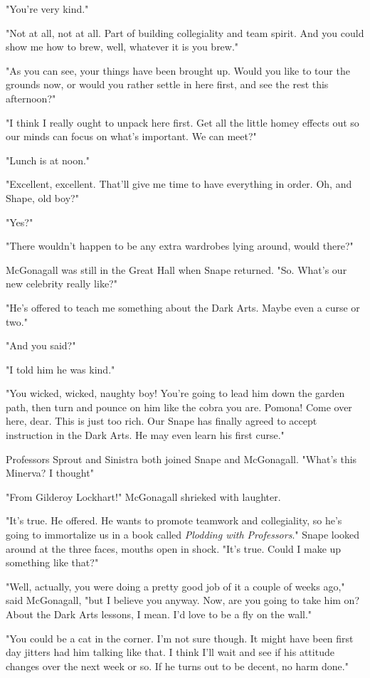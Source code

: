 "You're very kind."

"Not at all, not at all. Part of building collegiality and team spirit. And you could show me how to brew, well, whatever it is you brew."

"As you can see, your things have been brought up. Would you like to tour the grounds now, or would you rather settle in here first, and see the rest this afternoon?"

"I think I really ought to unpack here first. Get all the little homey effects out so our minds can focus on what's important. We can meet{\el}?"

"Lunch is at noon."

"Excellent, excellent. That'll give me time to have everything in order. Oh, and Shape, old boy{\el}?"

"Yes?"

"There wouldn't happen to be any extra wardrobes lying around, would there?"

McGonagall was still in the Great Hall when Snape returned. "So. What's our new celebrity really like?"

"He's offered to teach me something about the Dark Arts. Maybe even a curse or two."

"And you said{\el}?"

"I told him he was kind."

"You wicked, wicked, naughty boy! You're going to lead him down the garden path, then turn and pounce on him like the cobra you are. Pomona! Come over here, dear. This is just too rich. Our Snape has finally agreed to accept instruction in the Dark Arts. He may even learn his first curse."

Professors Sprout and Sinistra both joined Snape and McGonagall. "What's this Minerva? I thought{\el}"

"From Gilderoy Lockhart!" McGonagall shrieked with laughter.

"It's true. He offered. He wants to promote teamwork and collegiality, so he's going to immortalize us in a book called \emph{Plodding with Professors}." Snape looked around at the three faces, mouths open in shock. "It's true. Could I make up something like that?"

"Well, actually, you were doing a pretty good job of it a couple of weeks ago," said McGonagall, "but I believe you anyway. Now, are you going to take him on? About the Dark Arts lessons, I mean. I'd love to be a fly on the wall."

"You could be a cat in the corner. I'm not sure though. It might have been first day jitters had him talking like that. I think I'll wait and see if his attitude changes over the next week or so. If he turns out to be decent, no harm done."

